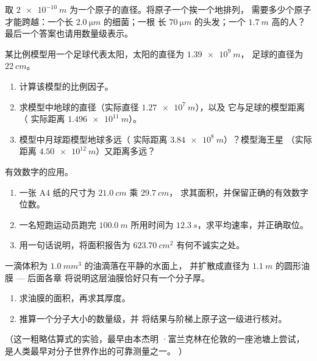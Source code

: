 \begin{exercise}[$\star\star$]\label{exo:g10:orders-of-magnitude:9}
取 $\qty{2e-10}{m}$ 为一个原子的直径。将原子一个挨一个地排列，
需要多少个原子才能跨越：一个长 $\qty{2.0}{\micro m}$ 的细菌；一根
长 $\qty{70}{\micro m}$ 的头发；一个 $\qty{1.7}{m}$ 高的人？
最后一个答案也请用数量级表示。
\end{exercise}

\begin{exercise}[$\star\star$]\label{exo:g10:orders-of-magnitude:10}
某比例模型用一个足球代表太阳，太阳的直径为 $\qty{1.39e9}{m}$，
足球的直径为 $\qty{22}{cm}$。
\begin{enumerate}
  \item 计算该模型的比例因子。
  \item 求模型中地球的直径（实际直径 $\qty{1.27e7}{m}$），以及
        它与足球的模型距离（
        实际距离 $\qty{1.496e11}{m}$）。
  \item 模型中月球距模型地球多远（
        实际距离 $\qty{3.84e8}{m}$）？模型海王星
        （实际距离 $\qty{4.50e12}{m}$）又距离多远？
\end{enumerate}
\end{exercise}

\begin{exercise}[$\star\star$]\label{exo:g10:orders-of-magnitude:11}
有效数字的应用。
\begin{enumerate}
  \item 一张 A4 纸的尺寸为 $\qty{21.0}{cm}$ 乘 $\qty{29.7}{cm}$，
        求其面积，并保留正确的有效数字位数。
  \item 一名短跑运动员跑完 $\qty{100.0}{m}$ 所用时间为
        $\qty{12.3}{s}$，求平均速率，并正确取位。
  \item 用一句话说明，将面积报告为
        $\qty{623.70}{cm^2}$ 有何不诚实之处。
\end{enumerate}
\end{exercise}

\begin{exercise}[$\star\star\star$]\label{exo:g10:orders-of-magnitude:12}
一滴体积为 $\qty{1.0}{mm^3}$ 的油滴落在平静的水面上，
并扩散成直径为 $\qty{1.1}{m}$ 的圆形油膜 --- 后面各章
将说明这层油膜恰好只有一个分子厚。
\begin{enumerate}
  \item 求油膜的面积，再求其厚度。
  \item 推算一个分子大小的数量级，并
        将结果与阶梯上原子这一级进行核对。
\end{enumerate}
（这一粗略估算式的实验，最早由本杰明
·富兰克林在伦敦的一座池塘上尝试，是人类最早对分子世界作出的可靠测量之一。
）
\end{exercise}


